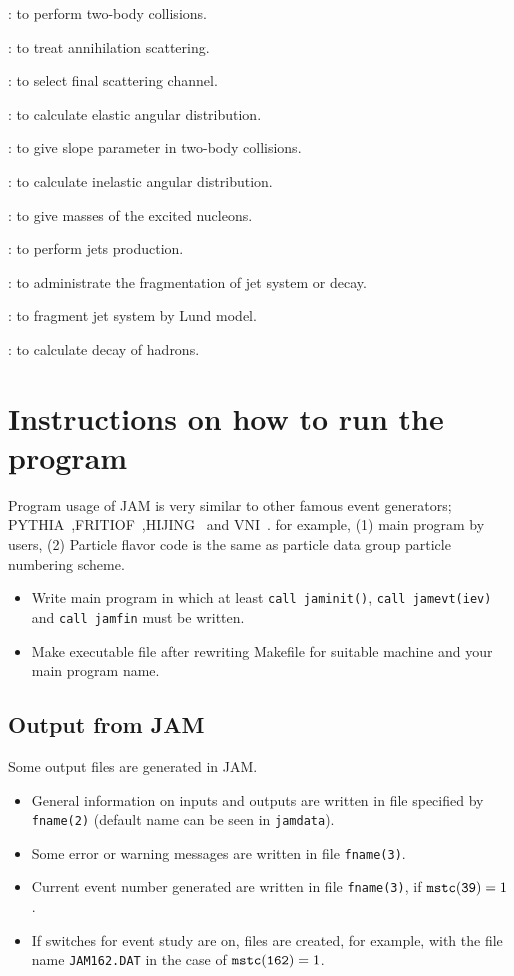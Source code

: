 \documentclass[]{article}
\newenvironment{entry}%
{\begin{list}{}{\setlength{\topsep}{0mm} \setlength{\itemsep}{0mm}
\setlength{\parskip}{0mm} \setlength{\parsep}{0mm}
\setlength{\leftmargin}{20mm} \setlength{\rightmargin}{0mm}
\setlength{\labelwidth}{18mm} \setlength{\labelsep}{2mm}}}%
{\end{list}}
\newcommand{\ttt}[1]{{\tt#1}}
\newcommand{\itemt}[1]{\item[{\tt #1}\hfill]}
\begin{document}
\begin{entry}
\itemt{subroutine jamscatt}: to perform two-body collisions.
\itemt{subroutine jamabsrb}: to treat annihilation scattering.
\itemt{subroutine jamchanl}: to select final scattering channel.
\itemt{subroutine jamangel}: to calculate elastic angular distribution.
\itemt{function jamslope}:   to give slope parameter in two-body collisions.
\itemt{subroutine jamangin}: to calculate inelastic angular distribution.
\itemt{subroutine jamsoft}:  to give masses of the excited nucleons.
\itemt{subroutine jamhard}:  to perform jets production.
\itemt{subroutine jamdec}:   to administrate the fragmentation of jet system or decay.
\itemt{subroutine jamjdec}:  to fragment jet system by Lund model.
\itemt{subroutine jamrdec}:  to calculate decay of hadrons.


\end{entry}


\section{Instructions on how to run the program}

 Program usage of JAM is very similar to other famous event generators;
 PYTHIA~\cite{pythia},FRITIOF~\cite{fritiof},HIJING~\cite{hijing}
 and VNI~\cite{vni}. for example, (1) main program by users,
 (2) Particle flavor code is the same as particle data group particle
     numbering scheme.

\begin{itemize}
\item Write main program in which at least 
       \ttt{call jaminit()}, \ttt{call jamevt(iev)} and
        \ttt{call jamfin} must be written.
\item Make executable  file after rewriting Makefile for suitable
      machine and your main program name.
\end{itemize}

\subsection{Output from JAM}
Some output files are generated in JAM.
\begin{itemize}
\item General information on inputs and outputs 
        are written in file
     specified by \ttt{fname(2)} (default name can be seen in \ttt{jamdata}).
\item
    Some error or warning messages are written in file 
    \ttt{fname(3)}.
\item
    Current event number generated are written in file \ttt{fname(3)},
    if $\ttt{mstc(39)}=1$.
\item
   If switches for event study are on,
   files are created, for example,  with the file name \ttt{JAM162.DAT}
   in the case of $\ttt{mstc(162)}=1$.

\end{itemize}
\end{document}
